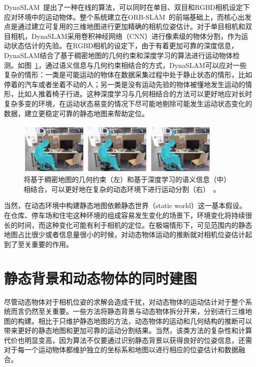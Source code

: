 DynaSLAM~\cite{DynaSLAM}提出了一种在线的算法，可以同时在单目、双目和RGBD相机设定下应对环境中的运动物体。整个系统建立在ORB-SLAM~\cite{orbslam2}的前端基础上，而核心出发点是通过建立可复用的三维地图进行更加精确的相机位姿估计。对于单目相机和双目相机，DynaSLAM采用卷积神经网络（CNN）进行像素级的物体分割，作为运动状态估计的先验。在RGBD相机的设定下，由于有着更加可靠的深度信息，DynaSLAM结合了基于稠密地图的几何约束和深度学习的算法进行运动物体检测。如图~\ref{fig:dynaSLAM}，通过语义信息与几何约束相结合的方式，DynaSLAM可以应对一些复杂的情形：一类是可能运动的物体在数据采集过程中处于静止状态的情形，比如停着的汽车或者坐着不动的人；另一类是没有运动先验的物体被懂地发生运动的情形，比如人推着椅子行进。这种深度学习与几何相结合的方法可以更好地应对长时复杂多变的环境，在运动状态易变的情况下尽可能地剔除可能发生运动状态变化的数据，建立更稳定可靠的静态地图来帮助定位。

\begin{figure}[!htbp]
	\centering
	\includegraphics[width=0.9\textwidth]{figs/2-1/dynaSLAM.jpeg}
	\caption{将基于稠密地图的几何约束（左）和基于深度学习的语义信息（中）相结合，可以更好地在复杂的动态环境下进行运动分割（右）~\cite{DynaSLAM}。}
	\label{fig:dynaSLAM}
\end{figure}

当然，在动态环境中构建静态地图依赖静态世界（static world）这一基本假设。在仓库、停车场和住宅这种环境的组成容易发生变化的场景下，环境变化将持续很长的时间，而这种变化可能有利于相机的定位。在极端情形下，可见范围内的静态地图占比很少或者信息量很小的时候，对动态物体运动的推断就对相机位姿估计起到了至关重要的作用。

\section{静态背景和动态物体的同时建图}
\label{subsec:static_and_dynamic}
尽管动态物体对于相机位姿的求解会造成干扰，对动态物体的运动估计对于整个系统而言仍然至关重要。一些方法将静态背景与动态物体拆分开来，分别进行三维地图的构建。相比于只维护静态地图的方法，动态物体的运动和几何结构的推断可以带来更好的静态地图和更加可靠的运动分割结果。当然，该类方法的复杂性和计算代价也明显变高，因为算法不仅要通过识别静态背景以获得良好的位姿信息，还需对于每一个运动物体都维护独立的坐标系和地图以进行相应的位姿估计和数据融合。

